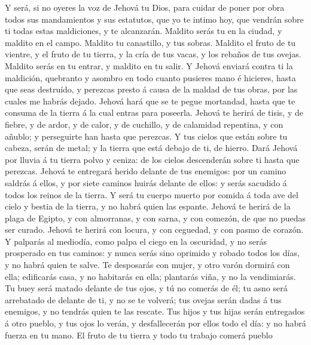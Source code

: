  Y será, si no oyeres la voz de Jehová tu Dios, para
cuidar de poner por obra todos sus mandamientos y sus estatutos, que yo
te intimo hoy, que vendrán sobre ti todas estas maldiciones, y te
alcanzarán.  Maldito serás tu en la ciudad, y maldito en
el campo.  Maldito tu canastillo, y tus sobras.
 Maldito el fruto de tu vientre, y el fruto de tu tierra,
y la cría de tus vacas, y los rebaños de tus ovejas. 
Maldito serás en tu entrar, y maldito en tu salir.  Y
Jehová enviará contra ti la maldición, quebranto y asombro en todo
cuanto pusieres mano é hicieres, hasta que seas destruído, y perezcas
presto á causa de la maldad de tus obras, por las cuales me habrás
dejado.  Jehová hará que se te pegue mortandad, hasta que
te consuma de la tierra á la cual entras para poseerla. 
Jehová te herirá de tisis, y de fiebre, y de ardor, y de calor, y de
cuchillo, y de calamidad repentina, y con añublo; y perseguirte han
hasta que perezcas.  Y tus cielos que están sobre tu
cabeza, serán de metal; y la tierra que está debajo de ti, de hierro.
 Dará Jehová por lluvia á tu tierra polvo y ceniza: de
los cielos descenderán sobre ti hasta que perezcas. 
Jehová te entregará herido delante de tus enemigos: por un camino
saldrás á ellos, y por siete caminos huirás delante de ellos: y serás
sacudido á todos los reinos de la tierra.  Y será tu
cuerpo muerto por comida á toda ave del cielo y bestia de la tierra, y
no habrá quien las espante.  Jehová te herirá de la plaga
de Egipto, y con almorranas, y con sarna, y con comezón, de que no
puedas ser curado.  Jehová te herirá con locura, y con
ceguedad, y con pasmo de corazón.  Y palparás al
mediodía, como palpa el ciego en la oscuridad, y no serás prosperado en
tus caminos: y nunca serás sino oprimido y robado todos los días, y no
habrá quien te salve.  Te desposarás con mujer, y otro
varón dormirá con ella; edificarás casa, y no habitarás en ella;
plantarás viña, y no la vendimiarás.  Tu buey será matado
delante de tus ojos, y tú no comerás de él; tu asno será arrebatado de
delante de ti, y no se te volverá; tus ovejas serán dadas á tus
enemigos, y no tendrás quien te las rescate.  Tus hijos y
tus hijas serán entregados á otro pueblo, y tus ojos lo verán, y
desfallecerán por ellos todo el día: y no habrá fuerza en tu mano.
 El fruto de tu tierra y todo tu trabajo comerá pueblo
